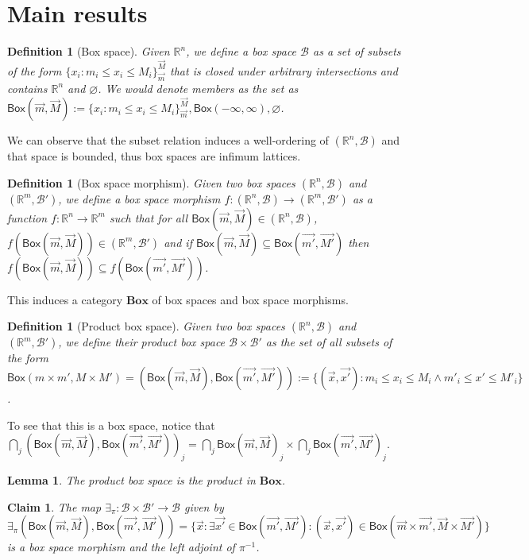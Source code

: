 \documentclass[12pt]{article}
\newtheorem{lemma}[theorem]{Lemma}
\newtheorem{definition}[theorem]{Definition}
\newtheorem{claim}{Claim}
\newcommand{\bobject}{\mathsf{Box}}
\begin{document}

\section{Main results}
\label{sec:main}

\begin{definition}[Box space]
Given $\mathbb{R}^n$, we define a box space $\mathcal{B}$ as a set
of subsets of the form
$\{x_i:m_i\leq x_i\leq M_i\}_{\vec{m}}^{\vec{M}}$ that is closed under arbitrary intersections and contains $\mathbb{R}^n$ and $\varnothing$. We would
denote members as the set as $\bobject(\vec{m},\vec{M}):=\{x_i:m_i\leq x_i\leq M_i\}_{\vec{m}}^{\vec{M}},\bobject(-\infty,\infty),\varnothing$.
\end{definition}
We can observe that the subset relation induces a well-ordering of
$(\mathbb{R}^n,\mathcal{B})$ and that space is bounded, thus box spaces are
infimum lattices.
\begin{definition}[Box space morphism]
    Given two box spaces $(\mathbb{R}^n,\mathcal{B})$ and $(\mathbb{R}^m,\mathcal{B}')$,
    we define a box space morphism $f:(\mathbb{R}^n,\mathcal{B})\to(\mathbb{R}^m,\mathcal{B}')$ as a function
    $f:\mathbb{R}^n\to\mathbb{R}^m$ such that for all $\bobject(\vec{m},\vec{M})\in(\mathbb{R}^n,\mathcal{B})$,
    $f(\bobject(\vec{m},\vec{M}))\in(\mathbb{R}^m,\mathcal{B}')$ and if $\bobject(\vec{m},\vec{M})\subseteq\bobject(\vec{m'},\vec{M'})$
    then $f(\bobject(\vec{m},\vec{M}))\subseteq f(\bobject(\vec{m'},\vec{M'}))$.
\end{definition}
This induces a category $\mathbf{Box}$ of box spaces and box space morphisms.
\begin{definition}[Product box space]
    Given two box spaces $(\mathbb{R}^n,\mathcal{B})$ and $(\mathbb{R}^m,\mathcal{B}')$,
    we define their product box space $\mathcal{B}\times\mathcal{B}'$ as the set of all subsets of the form
    $\bobject(m\times m',M\times M')=(\bobject(\vec{m},\vec{M}),\bobject(\vec{m'},\vec{M'})):=\{(\vec{x}, \vec{x'}):m_i\leq x_i\leq M_i\land m'_i\leq x'\leq M'_i\}$. 
\end{definition}
To see that this is a box space,
    notice that $\bigcap_j (\bobject(\vec{m},\vec{M}),\bobject(\vec{m'},\vec{M'}))_j=\bigcap_j \bobject(\vec{m},\vec{M})_j \times \bigcap_j \bobject(\vec{m'},\vec{M'})_j$.
\begin{lemma}
    The product box space is the product in $\mathbf{Box}$.
\end{lemma}
\begin{claim}
    The map $\exists_\pi:\mathcal{B}\times\mathcal{B}'\to\mathcal{B}$ given by
    \[
        \exists_\pi(\bobject(\vec{m},\vec{M}),\bobject(\vec{m'},\vec{M'}))=\{\vec{x}:\exists \vec{x'}\in \bobject(\vec{m'},\vec{M'}):(\vec{x},\vec{x'})
        \in \bobject(\vec{m}\times \vec{m'},\vec{M}\times \vec{M'})
        \}
    \]
    is a box space morphism and the left adjoint of $\pi^{-1}$.
\end{claim}
\end{document}
